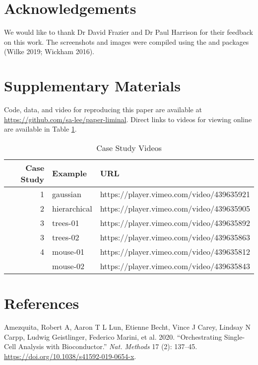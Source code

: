 \documentclass[article,notitle]{jdssv}
\begin{document}
\hypertarget{acknowledgements}{%
\section*{Acknowledgements}\label{acknowledgements}}

We would like to thank Dr David Frazier and Dr Paul Harrison for
their feedback on this work. The screenshots and images were compiled using the
 and  packages (Wilke 2019; Wickham 2016).

\hypertarget{supplementary-materials}{%
\section*{Supplementary Materials}\label{supplementary-materials}}

Code, data, and video for reproducing this paper are available at \url{https://github.com/sa-lee/paper-liminal}. Direct links to videos for viewing
online are available in Table \ref{tab:vimeo}.

\begin{table}

\caption{\label{tab:vimeo}Case Study Videos}
\centering
\begin{tabular}[t]{rll}
\toprule
Case Study & Example & URL\\
\midrule
1 & gaussian & https://player.vimeo.com/video/439635921\\
2 & hierarchical & https://player.vimeo.com/video/439635905\\
3 & trees-01 & https://player.vimeo.com/video/439635892\\
3 & trees-02 & https://player.vimeo.com/video/439635863\\
4 & mouse-01 & https://player.vimeo.com/video/439635812\\
\addlinespace
4 & mouse-02 & https://player.vimeo.com/video/439635843\\
\bottomrule
\end{tabular}
\end{table}

\hypertarget{references}{%
\section*{References}\label{references}}

\hypertarget{refs}{}
\leavevmode\hypertarget{ref-Amezquita2020-at}{}%
Amezquita, Robert A, Aaron T L Lun, Etienne Becht, Vince J Carey, Lindsay N Carpp, Ludwig Geistlinger, Federico Marini, et al. 2020. ``Orchestrating Single-Cell Analysis with Bioconductor.'' \emph{Nat. Methods} 17 (2): 137--45. \url{https://doi.org/10.1038/s41592-019-0654-x}.
\end{document}
